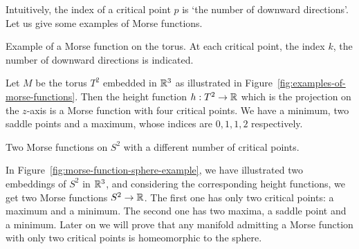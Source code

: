 Intuitively, the index of a critical point $p$ is `the number of downward directions'.
Let us give some examples of Morse functions.
\begin{marginfigure}
    \centering
    \caption{Example of a Morse function on the torus. At each critical point, the index $k$, the number of downward directions is indicated. }
    \label{fig:examples-of-morse-functions}
\end{marginfigure}
\begin{eg}
    Let $M$ be the torus  $T^2$ embedded in $\mathbb{R}^3$ as illustrated in Figure~\ref{fig:examples-of-morse-functions}.
    Then the height function $h: T^2 \to  \mathbb{R}$ which is the projection on the $z$-axis is a Morse function with four critical points.
    We have a minimum, two saddle points and a maximum, whose indices are $0, 1, 1, 2$ respectively.
\end{eg}


\begin{marginfigure}
    \centering
    \caption{Two Morse functions on $S^2$ with a different number of critical points.}
    \label{fig:morse-function-sphere-example}
\end{marginfigure}
\begin{eg}
    In Figure~\ref{fig:morse-function-sphere-example}, we have illustrated two embeddings of $S^2$ in $\mathbb{R}^3$, and considering the corresponding height functions, we get two Morse functions $S^2 \to  \mathbb{R}$.
    The first one has only two critical points: a maximum and a minimum.
    The second one has two maxima, a saddle point and a minimum.
    Later on we will prove that any manifold admitting a Morse function with only two critical points is homeomorphic to the sphere.
\end{eg}


